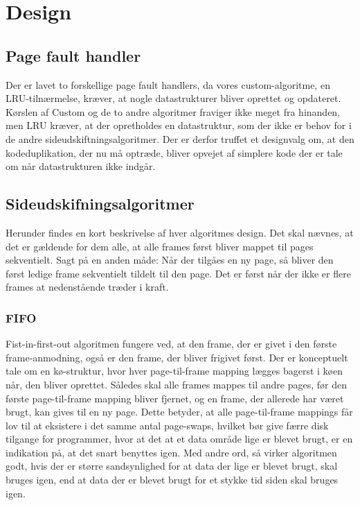\section{Design}
\label{sec:design}

\subsection{Page fault handler}
Der er lavet to forskellige page fault handlers, da vores custom-algoritme, en LRU-tilnærmelse, kræver, at nogle datastrukturer bliver oprettet og opdateret. Kørslen af Custom og de to andre algoritmer fraviger ikke meget fra hinanden, men LRU kræver, at der opretholdes en datastruktur, som der ikke er behov for i de andre sideudskiftningsalgoritmer. Der er derfor truffet et designvalg om, at den kodeduplikation, der nu må optræde, bliver opvejet af simplere kode der er tale om når datastrukturen ikke indgår.  

\subsection{Sideudskifningsalgoritmer}
Herunder findes en kort beskrivelse af hver algoritmes design. Det skal nævnes, at det er gældende for dem alle, at alle frames først bliver mappet til pages sekventielt. Sagt på en anden måde: Når der tilgåes en ny page, så bliver den først ledige frame sekventielt tildelt til den page. Det er først når der ikke er flere frames at nedenstående træder i kraft.
	
	\subsubsection{FIFO}
	Fist-in-first-out algoritmen fungere ved, at den frame, der er givet i den første frame-anmodning, også er den frame, der bliver frigivet først. Der er konceptuelt tale om en kø-struktur, hvor hver page-til-frame mapping lægges bagerst i køen når, den bliver oprettet. Således skal alle frames mappes til andre pages, før den første page-til-frame mapping bliver fjernet, og en frame, der allerede har været brugt, kan gives til en ny page. Dette betyder, at alle page-til-frame mappings får lov til at eksistere i det samme antal page-swaps, hvilket bør give færre disk tilgange for programmer, hvor at det at et data område lige er blevet brugt, er en indikation på, at det snart benyttes igen. Med andre ord, så virker algoritmen godt, hvis der er større sandsynlighed for at data der lige er blevet brugt, skal bruges igen, end at data der er blevet brugt for et stykke tid siden skal bruges igen.

